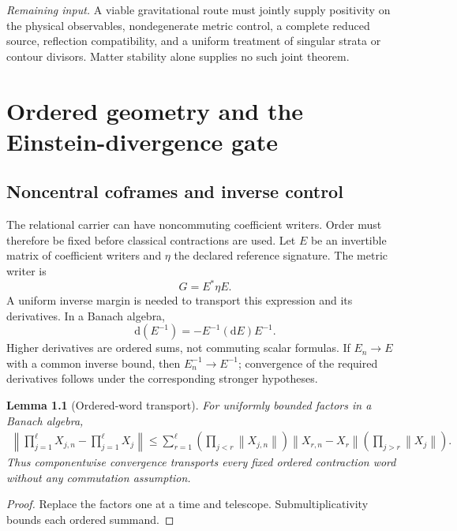 \documentclass[11pt,a4paper,oneside]{book}
\theoremstyle{plain}
\newtheorem{lemma}[theorem]{Lemma}
\theoremstyle{definition}
\theoremstyle{remark}
\newcommand{\dd}{\mathrm d}
\newcommand{\norm}[1]{\left\lVert#1\right\rVert}
\newcommand{\src}[2]{\cite{#1}}
\newcommand{\gate}[1]{\par\smallskip\noindent\textit{Remaining input.} #1\par\smallskip}
\begin{document}
\gate{A viable gravitational route must jointly supply positivity on the physical observables, nondegenerate metric control, a complete reduced source, reflection compatibility, and a uniform treatment of singular strata or contour divisors. Matter stability alone supplies no such joint theorem.}


\chapter{Ordered geometry and the Einstein-divergence gate}
\label{ch:cartan}
\section{Noncentral coframes and inverse control}
The relational carrier can have noncommuting coefficient writers. Order must therefore be fixed before classical contractions are used. Let $E$ be an invertible matrix of coefficient writers and $\eta$ the declared reference signature. The metric writer is
\begin{equation}
 G=E^*\eta E.
 \label{eq:ordered-metric}
\end{equation}
A uniform inverse margin is needed to transport this expression and its derivatives. In a Banach algebra,
\begin{equation}
 \dd(E^{-1})=-E^{-1}(\dd E)E^{-1}.
 \label{eq:inverse-coframe}
\end{equation}
Higher derivatives are ordered sums, not commuting scalar formulas. If $E_n\to E$ with a common inverse bound, then $E_n^{-1}\to E^{-1}$; convergence of the required derivatives follows under the corresponding stronger hypotheses. \cite{R13}

\begin{lemma}[Ordered-word transport]
\label{lem:word-telescope}
For uniformly bounded factors in a Banach algebra,
\begin{equation}
\begin{split}
 \norm{\prod_{j=1}^{\ell}X_{j,n}-\prod_{j=1}^{\ell}X_j}
 \le\sum_{r=1}^{\ell}
 \left(\prod_{j<r}\norm{X_{j,n}}\right)
 \norm{X_{r,n}-X_r}
 \left(\prod_{j>r}\norm{X_j}\right).
\end{split}
 \label{eq:word-telescope}
\end{equation}
Thus componentwise convergence transports every fixed ordered contraction word without any commutation assumption.
\end{lemma}
\begin{proof}
Replace the factors one at a time and telescope. Submultiplicativity bounds each ordered summand.
\end{proof}
\src{R13}{lem:v13v96-word}
\end{document}
